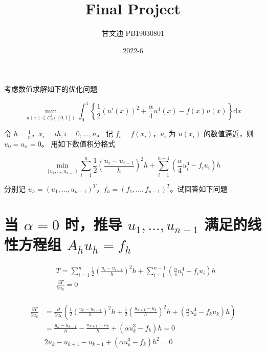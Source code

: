 \documentclass[a4paper,12pt]{ctexart}
\begin{document}
\title{Final Project}
\author{甘文迪 PB19030801}
\date{2022-6}

\maketitle
\pagestyle{empty}
\thispagestyle{empty}

考虑数值求解如下的优化问题

\begin{equation}
    \min_{u(x) \in C_0^1([0,1])}
    \int_{0}^{1} \left\{ \frac{1}{2}(u'(x))^2 + \frac{\alpha}{4}u^4(x) -f(x) u(x) \right\} \mathrm{d}x
\end{equation}


令 $h = \frac{1}{n}，x_i = ih, i = 0, \ldots, n$。
记 $f_i = f(x_i)$，$u_i$ 为 $u(x_i)$ 的数值逼近，则 $u_0 = u_n = 0$。
用如下数值积分格式

\begin{equation}
    \min_{\{u_1, \ldots, u_{n-1}\}}
    \sum_{i=1}^n \frac{1}{2}\left(\frac{u_i - u_{i-1}}{h} \right)^2 h + \sum_{i=1}^{n-1} \left(\frac{\alpha}{4}u_i^4 - f_i u_i\right) h
\end{equation}

分别记 $u_h = \left(u_1, \ldots, u_{n-1}\right)^T$，$f_h = \left(f_1, \ldots, f_{n-1}\right)^T$。试回答如下问题


\section{当 $\alpha = 0$ 时，推导 $u_1, \ldots, u_{n-1}$ 满足的线性方程组 $A_h u_h = f_h$}


$$
\begin{aligned}
&T = \sum_{i=1}^n \frac{1}{2}\left(\frac{u_i - u_{i-1}}{h} \right)^2 h + \sum_{i=1}^{n-1} \left(\frac{\alpha}{4}u_i^4 - f_i u_i\right) h \\
&\frac{\partial T}{\partial u_k} = 0
\end{aligned}
$$

$$
\begin{aligned}\\
    \frac{\partial T}{\partial u_k} &= \frac{\partial}{\partial u_k}\left(
        \frac{1}{2}\left(\frac{u_k - u_{k-1}}{h} \right)^2 h +
        \frac{1}{2}\left(\frac{u_{k+1} - u_{k}}{h} \right)^2 h +
        \left(\frac{\alpha}{4}u_k^4 - f_k u_k\right) h \right) \\
    &=\frac{u_k - u_{k-1}}{h} -
        \frac{u_{k+1} - u_{k}}{h} +
        \left(\alpha u_k^3 - f_k\right) h =0 \\
    & 2u_k - u_{k+1} - u_{k-1} +  \left(\alpha u_k^3 - f_k\right) h^2 = 0
\end{aligned}
$$
\end{document}
